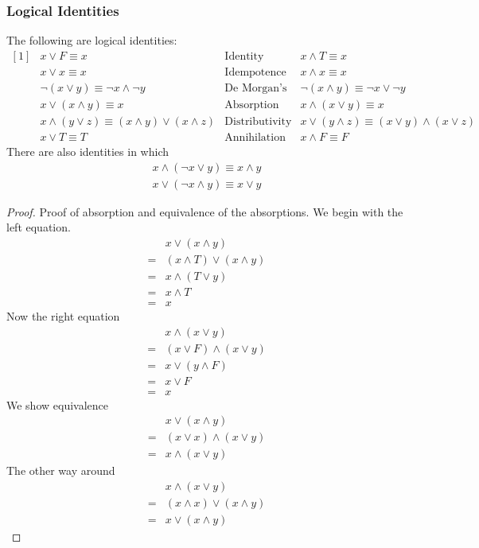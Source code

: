 \documentclass[a4paper]{article}
\theoremstyle{plain}
\theoremstyle{definition}
\theoremstyle{remark}
\begin{document}
\subsubsection{Logical Identities}
The following are logical identities:
\[
	\begin{matrix*}[1]
&x \lor F \equiv x &\text{Identity} & x \land T \equiv x\\
&x \lor x \equiv x & \text{Idempotence} & x \land x \equiv x\\
&\neg\left( x \lor y \right) \equiv \neg x \land \neg y & \text{De Morgan's Laws} & \neg \left( x \land y \right) \equiv \neg x \lor \neg y\\
&x \lor \left( x \land y \right) \equiv x & \text{Absorption} & x \land \left( x \lor y \right) \equiv x\\
& x \land \left( y \lor z \right) \equiv (x \land y) \lor \left( x \land z \right) & \text{Distributivity} & x \lor (y \land z) \equiv (x \lor y) \land (x \lor z)\\
& x \lor T \equiv T & \text{Annihilation} & x \land F \equiv F
	\end{matrix*}
\]
There are also identities in which
\begin{align*}
	x \land (\neg x \lor y) \equiv x \land y \\
	x \lor (\neg x \land y ) \equiv x \lor y
\end{align*}
\begin{proof}
	Proof of absorption and equivalence of the absorptions. We begin with the left equation.
	\begin{align*}
		&x \lor (x \land y)\\
		= &\left( x \land T \right) \lor \left( x \land y \right) \\
		= & x \land (T \lor y)\\
		= & x \land T\\
		= & x
	\end{align*}
	Now the right equation
	\begin{align*}
		&x \land (x \lor y)\\
		= &(x \lor F) \land \left( x \lor y \right) \\
		= &x \lor (y \land F)\\
		= &x \lor F\\
		= & x
	\end{align*}
	We show equivalence
	\begin{align*}
		&x \lor \left( x \land y \right) \\
		= & \left( x \lor x \right) \land (x \lor y)\\
		= & x \land (x \lor y)
	\end{align*}
	The other way around
	\begin{align*}
		&x \land \left( x \lor y \right)\\ 
		=&(x \land x) \lor (x \land y)\\
		=&x \lor (x \land y)
	\end{align*}
\end{proof}
\end{document}
